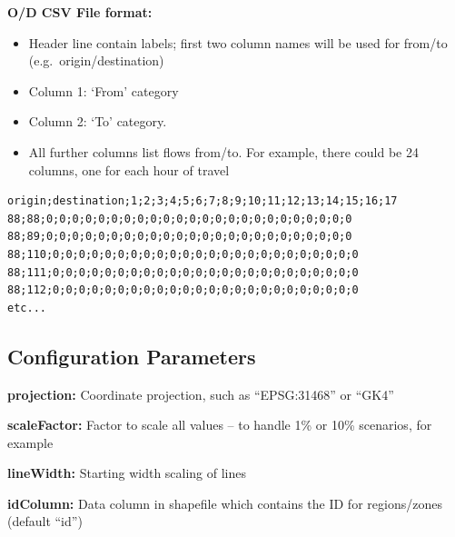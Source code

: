 \textbf{O/D CSV File format:}

\begin{itemize}
\tightlist
\item
  Header line contain labels; first two column names will be used for
  from/to (e.g.~origin/destination)
\item
  Column 1: `From' category
\item
  Column 2: `To' category.
\item
  All further columns list flows from/to. For example, there could be 24
  columns, one for each hour of travel
\end{itemize}

\begin{lstlisting}
origin;destination;1;2;3;4;5;6;7;8;9;10;11;12;13;14;15;16;17
88;88;0;0;0;0;0;0;0;0;0;0;0;0;0;0;0;0;0;0;0;0;0;0;0;0
88;89;0;0;0;0;0;0;0;0;0;0;0;0;0;0;0;0;0;0;0;0;0;0;0;0
88;110;0;0;0;0;0;0;0;0;0;0;0;0;0;0;0;0;0;0;0;0;0;0;0;0
88;111;0;0;0;0;0;0;0;0;0;0;0;0;0;0;0;0;0;0;0;0;0;0;0;0
88;112;0;0;0;0;0;0;0;0;0;0;0;0;0;0;0;0;0;0;0;0;0;0;0;0
etc...
\end{lstlisting}

\hypertarget{configuration-parameters}{%
\subsection{Configuration Parameters}\label{configuration-parameters}}

\textbf{projection:} Coordinate projection, such as ``EPSG:31468'' or
``GK4''

\textbf{scaleFactor:} Factor to scale all values -- to handle 1\% or
10\% scenarios, for example

\textbf{lineWidth:} Starting width scaling of lines

\textbf{idColumn:} Data column in shapefile which contains the ID for
regions/zones (default ``id'')
